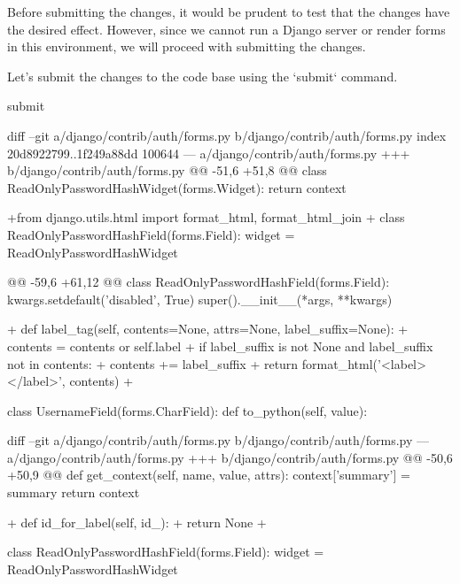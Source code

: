 {\begin{agentbox}
Before submitting the changes, it would be prudent to test that the changes have the desired effect. However, since we cannot run a Django server or render forms in this environment, we will proceed with submitting the changes.



Let's submit the changes to the code base using the `submit` command.



\hrulefill
\begin{CodeVerbatim}[breaklines=true, breakanywhere=true]
submit
\end{CodeVerbatim}
\end{agentbox}
\begin{observationbox}\begin{CodeVerbatim}[breaklines=true, breakanywhere=true]

diff --git a/django/contrib/auth/forms.py b/django/contrib/auth/forms.py
index 20d8922799..1f249a88dd 100644
--- a/django/contrib/auth/forms.py
+++ b/django/contrib/auth/forms.py
@@ -51,6 +51,8 @@ class ReadOnlyPasswordHashWidget(forms.Widget):
         return context
 
 
+from django.utils.html import format_html, format_html_join
+
 class ReadOnlyPasswordHashField(forms.Field):
     widget = ReadOnlyPasswordHashWidget
 
@@ -59,6 +61,12 @@ class ReadOnlyPasswordHashField(forms.Field):
         kwargs.setdefault('disabled', True)
         super().__init__(*args, **kwargs)
 
+    def label_tag(self, contents=None, attrs=None, label_suffix=None):
+        contents = contents or self.label
+        if label_suffix is not None and label_suffix not in contents:
+            contents += label_suffix
+        return format_html('<label>{}</label>', contents)
+
 
 class UsernameField(forms.CharField):
     def to_python(self, value):
\end{CodeVerbatim}
\end{observationbox}
\begin{goldpatchbox}
\begin{CodeVerbatim}[breaklines=true, breakanywhere=true]
diff --git a/django/contrib/auth/forms.py b/django/contrib/auth/forms.py
--- a/django/contrib/auth/forms.py
+++ b/django/contrib/auth/forms.py
@@ -50,6 +50,9 @@ def get_context(self, name, value, attrs):
         context['summary'] = summary
         return context
 
+    def id_for_label(self, id_):
+        return None
+
 
 class ReadOnlyPasswordHashField(forms.Field):
     widget = ReadOnlyPasswordHashWidget
\end{CodeVerbatim}
\end{goldpatchbox}
}